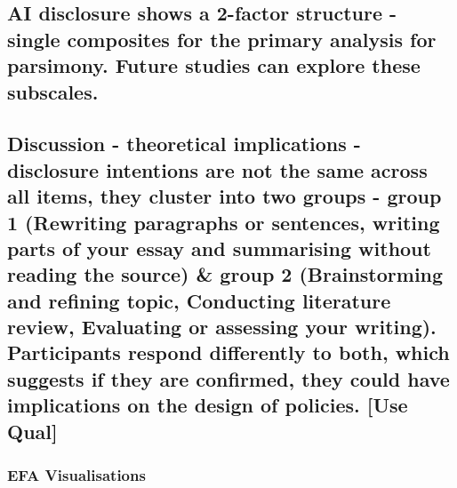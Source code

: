 \documentclass[
]{article}
\begin{document}
\subsection{AI disclosure shows a 2-factor structure - single composites
for the primary analysis for parsimony. Future studies can explore these
subscales.}\label{ai-disclosure-shows-a-2-factor-structure---single-composites-for-the-primary-analysis-for-parsimony.-future-studies-can-explore-these-subscales.}

\subsection{Discussion - theoretical implications - disclosure
intentions are not the same across all items, they cluster into two
groups - group 1 (Rewriting paragraphs or sentences, writing parts of
your essay and summarising without reading the source) \& group 2
(Brainstorming and refining topic, Conducting literature review,
Evaluating or assessing your writing). Participants respond differently
to both, which suggests if they are confirmed, they could have
implications on the design of policies. {[}Use
Qual{]}}\label{discussion---theoretical-implications---disclosure-intentions-are-not-the-same-across-all-items-they-cluster-into-two-groups---group-1-rewriting-paragraphs-or-sentences-writing-parts-of-your-essay-and-summarising-without-reading-the-source-group-2-brainstorming-and-refining-topic-conducting-literature-review-evaluating-or-assessing-your-writing.-participants-respond-differently-to-both-which-suggests-if-they-are-confirmed-they-could-have-implications-on-the-design-of-policies.-use-qual}

\subsubsection{EFA Visualisations}\label{efa-visualisations}
\end{document}
